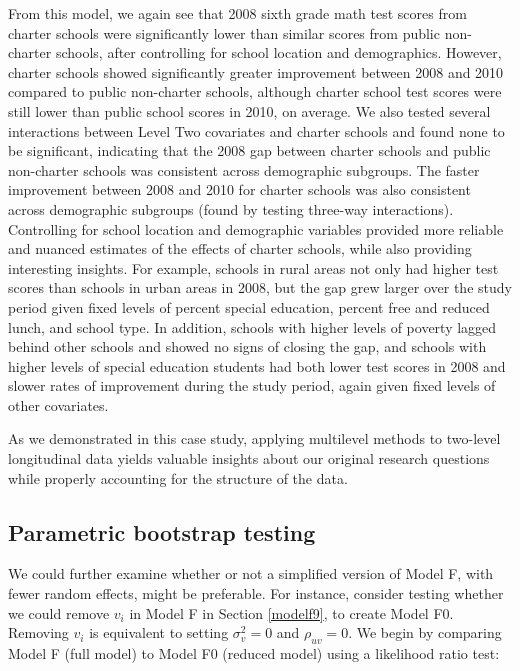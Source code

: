 \documentclass[
]{krantz}
\begin{document}
From this model, we again see that 2008 sixth grade math test scores from charter schools were significantly lower than similar scores from public non-charter schools, after controlling for school location and demographics. However, charter schools showed significantly greater improvement between 2008 and 2010 compared to public non-charter schools, although charter school test scores were still lower than public school scores in 2010, on average. We also tested several interactions between Level Two covariates and charter schools and found none to be significant, indicating that the 2008 gap between charter schools and public non-charter schools was consistent across demographic subgroups. The faster improvement between 2008 and 2010 for charter schools was also consistent across demographic subgroups (found by testing three-way interactions). Controlling for school location and demographic variables provided more reliable and nuanced estimates of the effects of charter schools, while also providing interesting insights. For example, schools in rural areas not only had higher test scores than schools in urban areas in 2008, but the gap grew larger over the study period given fixed levels of percent special education, percent free and reduced lunch, and school type. In addition, schools with higher levels of poverty lagged behind other schools and showed no signs of closing the gap, and schools with higher levels of special education students had both lower test scores in 2008 and slower rates of improvement during the study period, again given fixed levels of other covariates.

As we demonstrated in this case study, applying multilevel methods to two-level longitudinal data yields valuable insights about our original research questions while properly accounting for the structure of the data.

\hypertarget{longitudinal-paraboot}{%
\subsection{Parametric bootstrap testing}\label{longitudinal-paraboot}}

We could further examine whether or not a simplified version of Model F, with fewer random effects, might be preferable. For instance, consider testing whether we could remove \(v_i\) in Model F in Section \ref{modelf9}, to create Model F0. Removing \(v_i\) is equivalent to setting \(\sigma_{v}^{2} = 0\) and \(\rho_{uv} = 0\). We begin by comparing Model F (full model) to Model F0 (reduced model) using a likelihood ratio test:
\end{document}
